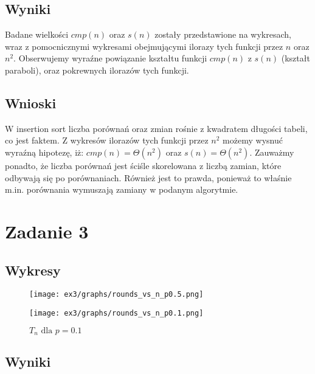 \documentclass{article}
\begin{document}
\subsection{Wyniki}

Badane wielkości $cmp(n)$ oraz $s(n)$ zostały przedstawione na wykresach, wraz z pomocnicznymi wykresami obejmującymi ilorazy tych funkcji przez $n$ oraz $n^2$. Obserwujemy wyraźne powiązanie kształtu funkcji $cmp(n)$ z $s(n)$ (kształt paraboli), oraz pokrewnych ilorazów tych funkcji.


\subsection{Wnioski}

W insertion sort liczba porównań oraz zmian rośnie z kwadratem długości tabeli, co jest faktem. Z wykresów ilorazów tych funkcji przez $n^2$ możemy wysnuć wyraźną hipotezę, iż: $cmp(n)=\Theta(n^2)$ oraz $s(n)=\Theta(n^2)$. Zauważmy ponadto, że liczba porównań jest ściśle skorelowana z liczbą zamian, które odbywają się po porównaniach. Również jest to prawda, ponieważ to właśnie m.in. porównania wymuszają zamiany w podanym algorytmie.

\section{Zadanie 3}

\subsection{Wykresy}

\begin{figure}[H]
    \centering
        \begin{minipage}{0.24\textwidth}
        \centering
        \texttt{[image: ex3/graphs/rounds\_vs\_n\_p0.5.png]}
        \caption{$T_n \text{ dla } p=0.5$}
    \end{minipage}
        \begin{minipage}{0.24\textwidth}
        \centering
        \texttt{[image: ex3/graphs/rounds\_vs\_n\_p0.1.png]}
        \caption{$T_n \text{ dla } p=0.1$}
    \end{minipage}
\end{figure}

\subsection{Wyniki}
\end{document}
